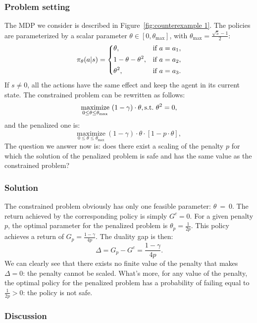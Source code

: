 \subsubsection{Problem setting} The MDP we consider is described in Figure~\ref{fig:counterexample 1}. The policies are parameterized by a scalar parameter $\theta\in[0,\theta_{\text{max}}]$, with $\theta_\text{max} = \frac{\sqrt{5}-1}{2}$:
$$
	\pi_\theta(a|s) = \begin{dcases}
		\theta,&\text{if}~a=a_1,\\
		1 - \theta - \theta^2,&\text{if}~a=a_2,\\
		\theta^2,&\text{if}~a=a_3.\\
	\end{dcases}
$$
If $s\neq0$, all the actions have the same effect and keep the agent in its current state. The constrained problem can be rewritten as follows:
\begin{equation*}
	\underset{0\leq\theta\leq\theta_\text{max}}{\text{maximize}}~(1-\gamma)\cdot\theta,\\
	\text{s.t.} ~\theta^2 = 0,
\end{equation*}
and the penalized one is:
\begin{equation*}
	\underset{0\leq\theta\leq\theta_\text{max}}{\text{maximize}}~(1-\gamma)\cdot\theta\cdot\left[1 - p\cdot\theta\right],
\end{equation*}
The question we answer now is: does there exist a scaling of the penalty $p$ for which the solution of the penalized problem is safe and has the same value as the constrained problem?

\subsubsection{Solution} The constrained problem obviously has only one feasible parameter: $\theta~=~0$. The return achieved by the corresponding policy is simply $G^c = 0$. For a given penalty $p$, the optimal parameter for the penalized problem is $\theta_p = \frac{1}{2p}$. This policy achieves a return of $G_p = \frac{1-\gamma}{4p}$. The duality gap is then:
$$
	\Delta = G_p - G^c = \frac{1-\gamma}{4p}.
$$
We can clearly see that there exists no finite value of the penalty that makes $\Delta = 0$: the penalty cannot be scaled. What's more, for any value of the penalty, the optimal policy for the penalized problem has a probability of failing equal to $\frac{1}{2p}>0$: the policy is not safe.

\subsubsection{Discussion} 
